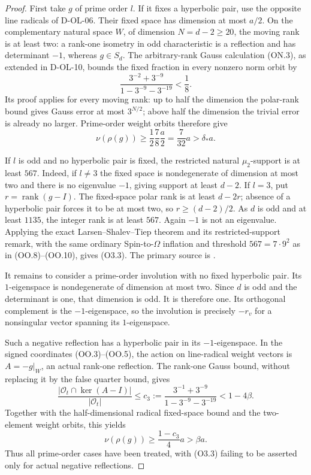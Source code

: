 \begin{proof}
First take $g$ of prime order $l$.  If it fixes a hyperbolic
pair, use the opposite line radicals of D-OL-06.  Their fixed
space has dimension at most $a/2$.  On the complementary
natural space $W$, of dimension $N=d-2\ge20$, the moving rank
is at least two: a rank-one isometry in odd characteristic is
a reflection and has determinant $-1$, whereas $g\in S_d$.
The arbitrary-rank Gauss calculation (ON.3), as extended in
D-OL-10, bounds the fixed fraction in every nonzero norm orbit
by
\[
 \frac{3^{-2}+3^{-9}}{1-3^{-9}-3^{-19}}<\frac18.
                                                               \tag{O3.4}
\]
Its proof applies for every moving rank: up to half the dimension
the polar-rank bound gives Gauss error at most $3^{N/2}$; above
half the dimension the trivial error is already no larger.
Prime-order weight orbits therefore give
\[
               \nu(\rho(g))\ge\frac12\frac78\frac a2
                              =\frac7{32}a>\delta_*a.       \tag{O3.5}
\]

If $l$ is odd and no hyperbolic pair is fixed, the restricted
natural $\mu_2$-support is at least $567$.  Indeed, if $l\ne3$
the fixed space is nondegenerate of dimension at most two and
there is no eigenvalue $-1$, giving support at least $d-2$.
If $l=3$, put $r=\operatorname{rank}(g-I)$.  The fixed-space
polar rank is at least $d-2r$; absence of a hyperbolic pair
forces it to be at most two, so $r\ge(d-2)/2$.  As $d$ is
odd and at least $1135$, the integer rank is at least $567$.
Again $-1$ is not an eigenvalue.  Applying the exact
Larsen--Shalev--Tiep theorem and its restricted-support remark,
with the same ordinary Spin-to-$\Omega$ inflation and threshold
$567=7\cdot9^2$ as in (OO.8)--(OO.10), gives (O3.3).
The primary source is
\cite[Theorem~4.3.6, (4.3.2), pp.~1917--1918; complete proof
pp.~1918--1923; Remark~4.3.7, p.~1923]{HOS:LST2011}.

It remains to consider a prime-order involution with no fixed
hyperbolic pair.  Its $1$-eigenspace is nondegenerate of
dimension at most two.  Since $d$ is odd and the determinant
is one, that dimension is odd.  It is therefore one.  Its
orthogonal complement is the $-1$-eigenspace, so the involution
is precisely $-r_v$ for a nonsingular vector spanning its
$1$-eigenspace.

Such a negative reflection has a hyperbolic pair in its
$-1$-eigenspace.  In the signed coordinates (OO.3)--(OO.5),
the action on line-radical weight vectors is
$A=-g|_W$, an actual rank-one reflection.  The rank-one Gauss
bound, without replacing it by the false quarter bound, gives
\[
 \frac{|\mathcal O_t\cap\ker(A-I)|}{|\mathcal O_t|}
 \le c_3:=\frac{3^{-1}+3^{-9}}{1-3^{-9}-3^{-19}}
                  <1-4\beta.
                                                               \tag{O3.6}
\]
Together with the half-dimensional radical fixed-space bound
and the two-element weight orbits, this yields
\[
              \nu(\rho(g))\ge\frac{1-c_3}{4}a>\beta a.
                                                               \tag{O3.7}
\]
Thus all prime-order cases have been treated, with (O3.3)
failing to be asserted only for actual negative reflections.


\end{proof}
